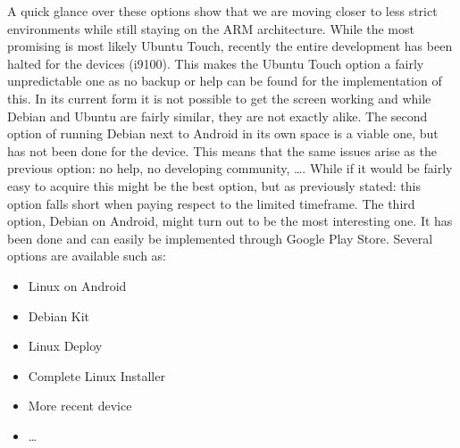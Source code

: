 A quick glance over these options show that we are moving closer to less strict environments while still staying on the ARM architecture. While the most promising is most likely Ubuntu Touch, recently the entire development has been halted for the devices (i9100). This makes the Ubuntu Touch option a fairly unpredictable one as no backup or help can be found for the implementation of this. In its current form it is not possible to get the screen working and while Debian and Ubuntu are fairly similar, they are not exactly alike.
\npar
The second option of running Debian next to Android in its own space is a viable one, but has not been done for the device. This means that the same issues arise as the previous option: no help, no developing community, \ldots. While if it would be fairly easy to acquire this might be the best option, but as previously stated: this option falls short when paying respect to the limited timeframe. 
\npar
The third option, Debian on Android, might turn out to be the most interesting one. It has been done and can easily be implemented through Google Play Store. Several options are available such as:

\begin{itemize}
	\item Linux on Android
	\item Debian Kit
	\item Linux Deploy
	\item Complete Linux Installer
	\item More recent device
	\item \ldots
\end{itemize}

